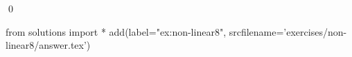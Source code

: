 
\begin{ex} 
  \label{ex:non-linear8}
  
  \qed
\end{ex} 
\begin{python0}
from solutions import *
add(label="ex:non-linear8",
    srcfilename='exercises/non-linear8/answer.tex') 
\end{python0}
